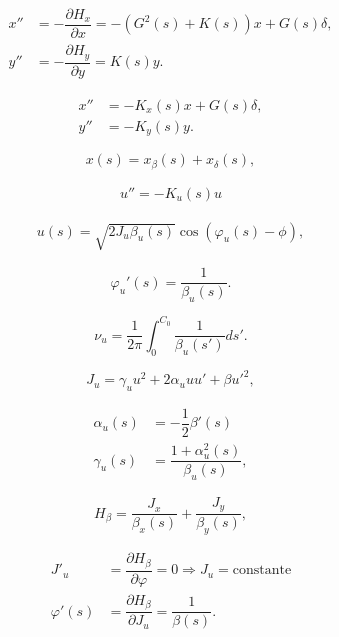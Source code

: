 \begin{align}
    x'' &= - \dfrac{\partial H_{x}}{\partial x}  = -\left(G^2(s) + K(s)\right)x + G(s)\delta, \\
    y'' &= - \dfrac{\partial H_{y}}{\partial y}  = K(s)y.
\end{align}



\begin{align}
    x'' &= -K_x(s)x + G(s)\delta, \\
    y'' &= - K_y(s)y.
\end{align}


\begin{equation}
    x(s) = x_\beta (s) + x_\delta (s),
\end{equation}

\begin{align}
    u'' = -K_u(s) u
    \label{hill}
\end{align}

\begin{align}
    u(s) = \sqrt{2J_u\beta_u(s)}\cos\left(\varphi_u(s) - \phi\right),
\end{align}

\begin{equation}
    \varphi_u'(s) = \dfrac{1}{\beta_u(s)}.
\end{equation}

\begin{equation}
    \nu_u = \dfrac{1}{2\pi} \int_{0}^{C_0} \dfrac{1}{\beta_u(s')}ds'.
\end{equation}

\begin{equation}
    J_u = \gamma_u u^2 + 2\alpha_u u u' + \beta u'^2,
    \label{acao}
\end{equation}

\begin{align}
    \alpha_u(s) &= -\dfrac{1}{2}\beta'(s) \\
    \gamma_u(s) &= \dfrac{1+\alpha^2_u(s)}{\beta_u(s)},
\end{align}

\begin{equation}
    H_\beta = \dfrac{J_x}{\beta_x(s)} + \dfrac{J_y}{\beta_y(s)},
\end{equation}


\begin{align}
    J'_u & = \dfrac{\partial H_\beta}{\partial \varphi} = 0 \Rightarrow J_u = \mathrm{constante}\\
    \varphi'(s) & = \dfrac{\partial H_\beta}{\partial J_u} = \dfrac{1}{\beta(s)}.
\end{align}


